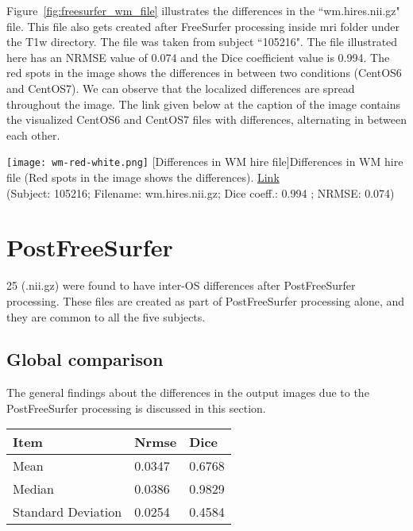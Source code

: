 Figure~\ref{fig:freesurfer_wm_file} illustrates the differences in the ``wm.hires.nii.gz" file. This file also gets created after FreeSurfer processing inside mri folder under the T1w directory. The file was taken from subject ``105216". The file illustrated here has an NRMSE value of 0.074 and the Dice coefficient value is 0.994. The red spots in the image shows the differences in between two conditions (CentOS6 and CentOS7). We can observe that the localized differences are spread throughout the image. The link given below at the caption of the image contains the visualized CentOS6 and CentOS7 files with differences, alternating in between each other.

\begin{center}
\texttt{[image: wm-red-white.png]}
[Differences in WM hire file]{Differences in WM hire file (Red spots in the image shows the differences). \href{https://drive.google.com/file/d/1i6WpH6Le5xry4j-RtRZxt0_NP3Ulm5AT/view?usp=sharing}{Link}\\(Subject: 105216; Filename: wm.hires.nii.gz; Dice coeff.: 0.994 ; NRMSE: 0.074)}
\label{fig:freesurfer_wm_file}
\end{center}

\section{PostFreeSurfer}\label{sec:Postfreesurfer}
25 (.nii.gz) were found to have inter-OS differences after PostFreeSurfer processing. These files are created as part of PostFreeSurfer processing alone, and they are common to all the five subjects.

\subsection{Global comparison}
The general findings about the differences in the output images due to the PostFreeSurfer processing is discussed in this section.

\begin{center}
\begin{tabular}{|l|l|l|}
\hline
\textbf{Item}      & \textbf{Nrmse} & \textbf{Dice} \\ \hline
Mean               & 0.0347     & 0.6768   \\ \hline
Median             & 0.0386    & 0.9829   \\ \hline
Standard Deviation & 0.0254    & 0.4584   \\ \hline
\end{tabular}
\label{tab:PostFreeSurfer_Metic_Values}
\end{center}

